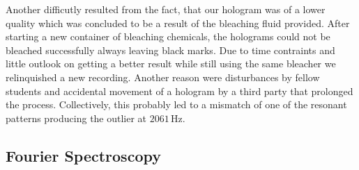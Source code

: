 Another difficutly resulted from the fact, that our hologram was of a lower quality which was concluded to be a result of the bleaching fluid provided. After starting a new container of bleaching chemicals, the holograms could not be bleached successfully always leaving black marks. Due to time contraints and little outlook on getting a better result while still using the same bleacher we relinquished a new recording. Another reason were disturbances by fellow students and accidental movement of a hologram by a third party that prolonged the process. Collectively, this probably led to a mismatch of one of the resonant patterns producing the outlier at $2061\,\mathrm{Hz}$.


\subsection{Fourier Spectroscopy}
